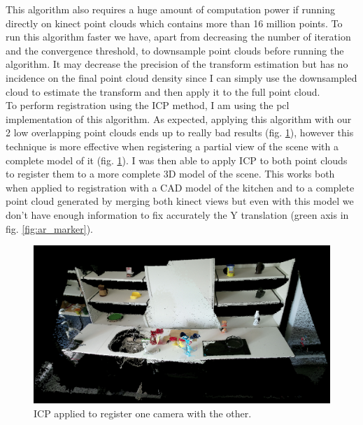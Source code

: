 This algorithm also requires a huge amount of computation power if running directly on kinect point clouds which contains more than 16 million points. To run this algorithm faster we have, apart from decreasing the number of iteration and the convergence threshold, to downsample point clouds before running the algorithm. It may decrease the precision of the transform estimation but has no incidence on the final point cloud density since I can simply use the downsampled cloud to estimate the transform and then apply it to the full point cloud.\\
\newline
To perform registration using the ICP method, I am using the \acrshort{pcl} implementation of this algorithm. As expected, applying this algorithm with our 2 low overlapping point clouds ends up to really bad results (fig. \ref{fig:icp_cams}), however this technique is more effective when registering a partial view of the scene with a complete model of it (fig. \ref{fig:icp_cams}). I was then able to apply ICP to both point clouds to register them to a more complete 3D model of the scene. This works both when applied to registration with a CAD model of the kitchen and to a complete point cloud generated by merging both kinect views but even with this model we don't have enough information to fix accurately the Y translation (green axis in fig. \ref{fig:ar_marker}). \\

\begin{figure}[h!]
    \centering
    \includegraphics[width=\textwidth]{images/icp_one_one_registration.png}
    \caption{ICP applied to register one camera with the other.}
    \label{fig:icp_cams}
\end{figure}

